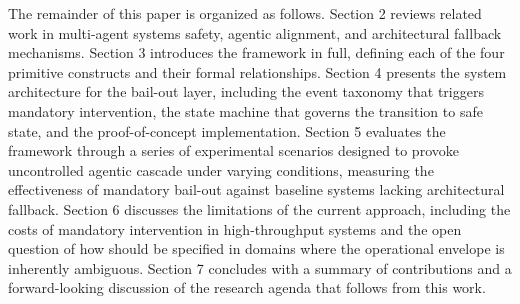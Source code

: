 The remainder of this paper is organized as follows. Section 2 reviews related work in multi-agent systems safety, agentic alignment, and architectural fallback mechanisms. Section 3 introduces the \bxthree framework in full, defining each of the four primitive constructs and their formal relationships. Section 4 presents the system architecture for the bail-out layer, including the event taxonomy that triggers mandatory intervention, the state machine that governs the transition to safe state, and the proof-of-concept implementation. Section 5 evaluates the framework through a series of experimental scenarios designed to provoke uncontrolled agentic cascade under varying conditions, measuring the effectiveness of mandatory bail-out against baseline systems lacking architectural fallback. Section 6 discusses the limitations of the current approach, including the costs of mandatory intervention in high-throughput systems and the open question of how \bounds should be specified in domains where the operational envelope is inherently ambiguous. Section 7 concludes with a summary of contributions and a forward-looking discussion of the research agenda that follows from this work.
